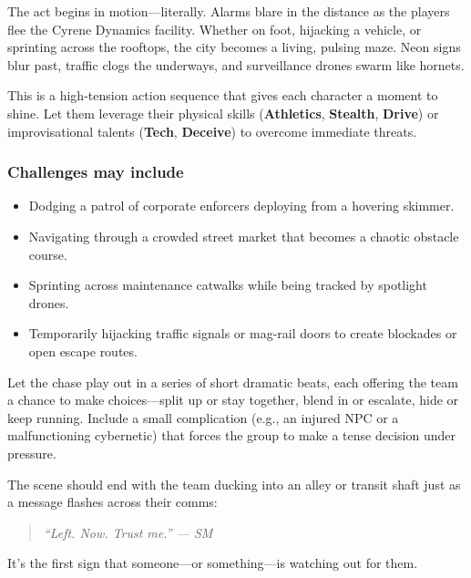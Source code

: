 The act begins in motion—literally. Alarms blare in the distance as the players flee the Cyrene Dynamics facility. Whether on foot, hijacking a vehicle, or sprinting across the rooftops, the city becomes a living, pulsing maze. Neon signs blur past, traffic clogs the underways, and surveillance drones swarm like hornets.

This is a high-tension action sequence that gives each character a moment to shine. Let them leverage their physical skills (\textbf{Athletics}, \textbf{Stealth}, \textbf{Drive}) or improvisational talents (\textbf{Tech}, \textbf{Deceive}) to overcome immediate threats.

\subsubsection{Challenges may include}
\begin{itemize}
    \item Dodging a patrol of corporate enforcers deploying from a hovering skimmer.
    \item Navigating through a crowded street market that becomes a chaotic obstacle course.
    \item Sprinting across maintenance catwalks while being tracked by spotlight drones.
    \item Temporarily hijacking traffic signals or mag-rail doors to create blockades or open escape routes.
\end{itemize}


\begin{GmTips}
    Let the chase play out in a series of short dramatic beats, each offering the team a chance to make choices—split up or stay together, blend in or escalate, hide or keep running. Include a small complication (e.g., an injured NPC or a malfunctioning cybernetic) that forces the group to make a tense decision under pressure.
\end{GmTips}

The scene should end with the team ducking into an alley or transit shaft just as a message flashes across their comms:

\vspace{0.5\baselineskip}
\begin{quote}
\textit{“Left. Now. Trust me.” — SM}
\end{quote}
\vspace{0.5\baselineskip}

It’s the first sign that someone—or something—is watching out for them.


